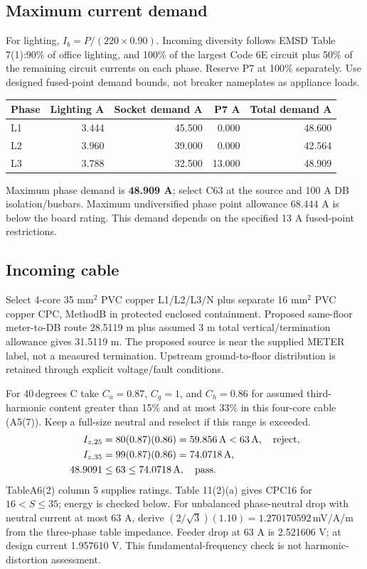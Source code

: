 \subsection*{Maximum current demand}
For lighting, $I_b=P/(220\times 0.90)$. Incoming diversity follows EMSD Table 7(1):90\% of office lighting, and 100\% of the largest Code 6E circuit plus 50\% of the remaining circuit currents on each phase. Reserve P7 at 100\% separately. Use designed fused-point demand bounds, not breaker nameplates as appliance loads.
\begin{center}\begin{tabular}{lrrrr}\toprule
Phase & Lighting A & Socket demand A & P7 A & Total demand A\\\midrule

L1 & 3.444 & 45.500 & 0.000 & 48.600 \\
L2 & 3.960 & 39.000 & 0.000 & 42.564 \\
L3 & 3.788 & 32.500 & 13.000 & 48.909 \\

\bottomrule\end{tabular}\end{center}
Maximum phase demand is \textbf{48.909 A};  select C63 at the source and 100 A DB isolation/busbars. Maximum undiversified phase point allowance 68.444 A is below the board rating. This demand depends on the specified 13 A fused-point restrictions.
\subsection*{Incoming cable}
Select 4-core 35 mm$^2$ PVC copper L1/L2/L3/N plus separate 16 mm$^2$ PVC copper CPC, MethodB in protected enclosed containment. Proposed same-floor meter-to-DB route 28.5119 m plus assumed 3 m total vertical/termination allowance gives 31.5119 m. The proposed source is near the supplied METER label, not a measured termination. Upstream ground-to-floor distribution is retained through explicit voltage/fault conditions.

For 40\,degrees C take $C_a=0.87$, $C_g=1$, and $C_h=0.86$ for assumed third-harmonic content greater than 15\% and at most 33\% in this four-core cable (A5(7)). Keep a full-size neutral and reselect if this range is exceeded.
\begin{align*}
I_{z,25}&=80(0.87)(0.86)=59.856\,{\rm A}<63\,{\rm A},\quad\text{reject},\\
I_{z,35}&=99(0.87)(0.86)=74.0718\,{\rm A},\\
48.9091&\le63\le74.0718\,{\rm A},\quad\text{pass}.
\end{align*}
TableA6(2) column 5 supplies ratings. Table 11(2)(a) gives CPC16 for $16<S\le 35$;  energy is checked below. For unbalanced phase-neutral drop with neutral current at most 63 A, derive $(2/\sqrt 3)(1.10)=1.270170592$\,mV/A/m from the three-phase table impedance. Feeder drop at 63 A is 2.521606 V;  at design current 1.957610 V. This fundamental-frequency check is not harmonic-distortion assessment.
